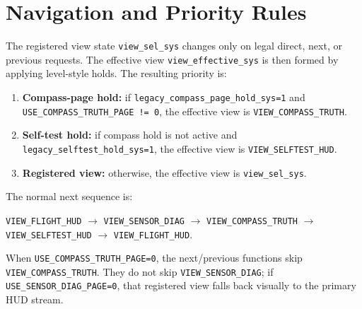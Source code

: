 \documentclass{article}
\newcommand{\sig}[1]{\begingroup\nolinkurl{#1}\endgroup}
\newcommand{\param}[1]{\begingroup\nolinkurl{#1}\endgroup}
\begin{document}
\section{Navigation and Priority Rules}

The registered view state \sig{view_sel_sys} changes only on legal direct,
next, or previous requests.  The effective view \sig{view_effective_sys} is
then formed by applying level-style holds.  The resulting priority is:

\begin{enumerate}
  \item \textbf{Compass-page hold:} if \sig{legacy_compass_page_hold_sys=1} and
        \param{USE_COMPASS_TRUTH_PAGE != 0}, the effective view is
        \sig{VIEW_COMPASS_TRUTH}.
  \item \textbf{Self-test hold:} if compass hold is not active and
        \sig{legacy_selftest_hold_sys=1}, the effective view is
        \sig{VIEW_SELFTEST_HUD}.
  \item \textbf{Registered view:} otherwise, the effective view is
        \sig{view_sel_sys}.
\end{enumerate}

The normal next sequence is:
\begin{center}
\sig{VIEW_FLIGHT_HUD}
\(\rightarrow\) \sig{VIEW_SENSOR_DIAG}
\(\rightarrow\) \sig{VIEW_COMPASS_TRUTH}
\(\rightarrow\) \sig{VIEW_SELFTEST_HUD}
\(\rightarrow\) \sig{VIEW_FLIGHT_HUD}.
\end{center}
When \param{USE_COMPASS_TRUTH_PAGE=0}, the next/previous functions skip
\sig{VIEW_COMPASS_TRUTH}.  They do not skip \sig{VIEW_SENSOR_DIAG}; if
\param{USE_SENSOR_DIAG_PAGE=0}, that registered view falls back visually to
the primary HUD stream.
\end{document}
